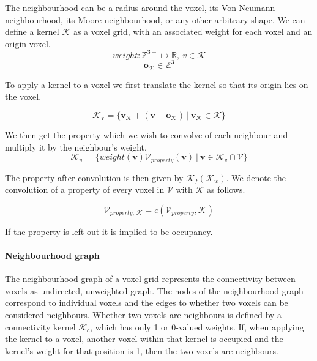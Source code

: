 The neighbourhood can be a radius around the voxel, its Von Neumann neighbourhood, its Moore neighbourhood, or any other arbitrary shape. We can define a kernel \(\mathcal{K}\) as a voxel grid, with an associated weight for each voxel  and an origin voxel.
\begin{equation}
weight: \mathbb{Z}^{3+} \mapsto \mathbb{R},\ v \in {\mathcal{K}}
\end{equation}
\begin{equation}
\boldsymbol{o}_{\mathcal{K}} \in \mathbb{Z}^{3}
\end{equation}

To apply a kernel to a voxel we first translate the kernel so that its origin lies on the voxel.

\begin{equation}
    \label{eq:kv}
\mathcal{K}_{\boldsymbol{v}} = \{\boldsymbol{v_{\mathcal{K}}} + (\boldsymbol{v} - \boldsymbol{o_{\mathcal{K}}})\ |\ \boldsymbol{v_{\mathcal{K}}} \in \mathcal{K}\}
\end{equation}

We then get the property which we wish to convolve of each neighbour and multiply it by the neighbour's weight.
\begin{equation}
    \label{eq:kw}
    \mathcal{K}_{w} = \{weight(\boldsymbol{v})\mathcal{V}_{property}(\boldsymbol{v})\ |\ \boldsymbol{v} \in \mathcal{K}_{v} \cap \mathcal{V}\}
\end{equation}

The property after convolution is then given by \(\mathcal{K}_f(\mathcal{K}_{w})\). We denote the convolution of a property of every voxel in \(\mathcal{V}\) with \(\mathcal{K}\) as follows.

\begin{equation}
    \label{eq:c}
    \mathcal{V}_{property,\  \mathcal{K}} = c(\mathcal{V}_{property},\mathcal{K})
\end{equation}

If the property is left out it is implied to be occupancy.

\paragraph{Neighbourhood graph}

The neighbourhood graph of a voxel grid represents the connectivity between voxels as undirected, unweighted graph. The nodes of the neighbourhood graph correspond to individual voxels and the edges to whether two voxels can be considered neighbours. Whether two voxels are neighbours is defined by a connectivity kernel \(\mathcal{K}_c\), which has only 1 or 0-valued weights. If, when applying the kernel to a voxel, another voxel within that kernel is occupied and the kernel's weight for that position is 1, then the two voxels are neighbours.

